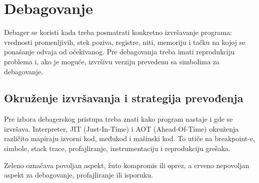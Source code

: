\section{Debagovanje}\label{debagovanje}

Debager se koristi kada treba posmatrati konkretno izvršavanje programa: vrednosti promenljivih, stek poziva, registre, niti, memoriju i tačku na kojoj se ponašanje odvaja od očekivanog. Pre debagovanja treba imati reprodukciju problema i, ako je moguće, izvršivu verziju prevedenu sa simbolima za debagovanje.

\subsection{Okruženje izvršavanja i strategija prevođenja}\label{okruzenje-izvrsavanja-strategija-prevodenja}

Pre izbora debagerskog pristupa treba znati kako program nastaje i gde se izvršava. Interpreter, JIT (Just-In-Time) i AOT (Ahead-Of-Time) okruženja različito mapiraju izvorni kod, međukod i mašinski kod. To utiče na breakpoint-e, simbole, stack trace, profajliranje, instrumentaciju i reprodukciju grešaka.

\newcommand{\rtgood}[1]{\textcolor{RuntimeGoodText}{#1}}
\newcommand{\rtwarn}[1]{\textcolor{RuntimeWarnText}{#1}}
\newcommand{\rtbad}[1]{\textcolor{RuntimeBadText}{#1}}

\noindent\rtgood{Zeleno} označava povoljan aspekt, \rtwarn{žuto} kompromis ili oprez, a \rtbad{crveno} nepovoljan aspekt za debagovanje, profajliranje ili isporuku.

